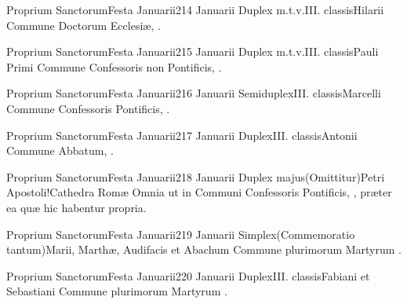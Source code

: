 \documentclass[nocturnale-romanum.tex]{subfiles}
\begin{document}
	{Proprium Sanctorum}{Festa Januarii}{2}{14 Januarii}
	{Duplex m.t.v.}{III. classis}{Hilarii}
	{Commune Doctorum Ecclesiæ, \pageref{M-CODO}.}
	{}
	
	{Proprium Sanctorum}{Festa Januarii}{2}{15 Januarii}
	{Duplex m.t.v.}{III. classis}{Pauli Primi}
	{Commune Confessoris non Pontificis, \pageref{M-CONP}.}
	{}
	
	{Proprium Sanctorum}{Festa Januarii}{2}{16 Januarii}
	{Semiduplex}{III. classis}{Marcelli}
	{Commune Confessoris Pontificis, \pageref{M-COPO}.}
	{}
	
	{Proprium Sanctorum}{Festa Januarii}{2}{17 Januarii}
	{Duplex}{III. classis}{Antonii}
	{Commune Abbatum, \pageref{M-COAB}.}
	{}

	{Proprium Sanctorum}{Festa Januarii}{2}{18 Januarii}
	{Duplex majus}{(Omittitur)}{Petri Apostoli!Cathedra Romæ}
	{Omnia ut in Communi Confessoris Pontificis, \pageref{M-COPO}, præter ea quæ hic habentur propria.}
	{}
\tedeumrubric

	{Proprium Sanctorum}{Festa Januarii}{2}{19 Januarii}
	{Simplex}{(Commemoratio tantum)}{Marii, Marthæ, Audifacis et Abachum}
	{Commune plurimorum Martyrum \pageref{M-PMEX}.}
	{}

	{Proprium Sanctorum}{Festa Januarii}{2}{20 Januarii}
	{Duplex}{III. classis}{Fabiani et Sebastiani}
	{Commune plurimorum Martyrum \pageref{M-PMEX}.}
	{}
\end{document}
